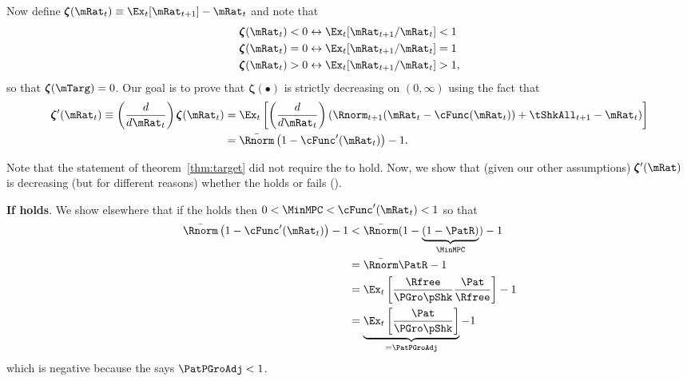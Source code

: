 \documentclass[BufferStockTheory]{subfiles}
\begin{document}
Now define \providecommand{\difFunc}{\pmb{\zeta}} $\difFunc(\mRat_t) \equiv 
\Ex_t[\mRat_{t+1}] - \mRat_t$ and note that
\begin{align}\label{eq:difRatioEquiv}
  \difFunc(\mRat_t) < 0 &\leftrightarrow \Ex_t[{\mRat}_{t+1}/\mRat_t] < 1 
                          \nonumber\\
  \difFunc(\mRat_t) = 0 &\leftrightarrow \Ex_t[{\mRat}_{t+1}/\mRat_t] = 1\\
  \difFunc(\mRat_t) > 0 &\leftrightarrow \Ex_t[{\mRat}_{t+1}/\mRat_t] > 
                          1,\nonumber
\end{align}
so that $\difFunc(\mTarg)=0$. Our goal is to prove that $\difFunc(\bullet)$ is strictly 
decreasing on $(0,\infty)$ using the fact that
\begin{align}
  \difFunc^{\prime}(\mRat_{t}) \equiv  \left( \frac{d}{d\mRat_{t}}\right) \difFunc(\mRat_t)  & = \Ex_{t}\left[
                                                                                               \left( \frac{d}{d\mRat_{t}}\right) \left( 
                                                                                               {\Rnorm}_{t+1}(\mRat_{t}-\cFunc(\mRat_{t}))+%
                                                                                               {\tShkAll}_{t+1} - {\mRat}_t\right) \right] \label{eq:difFuncDecreases} \\
                                                                                             & = \bar{\Rnorm}\left(1-\cFunc^{\prime}({\mRat}_t)\right) - 1.  \notag
\end{align}

Note that the statement of theorem~\ref{thm:target} did not require the {\RIC} to hold.  Now, we show that (given our other assumptions) $\difFunc^{\prime}(\mRat)$ is decreasing (but for different reasons) whether the {\RIC} holds or fails (\cncl{\RIC}).

\textbf{If {\RIC} holds}.   We show elsewhere  that if the {\RIC} holds then $0 < \MinMPC < \cFunc^{\prime}(\mRat_{t}) < 1$ so that 
\begin{align*}
  \bar{\Rnorm}\left(1-\cFunc^{\prime}({\mRat}_t)\right) - 1 & <  \bar{\Rnorm}(1-\underbrace{(1-\PatR)}_{\MinMPC}) - 1  \\
                                                            & = \bar{\Rnorm}\PatR - 1 \\
                                                            & = \Ex_{t}\left[\frac{\Rfree}{\PGro \pShk}\frac{\Pat}{\Rfree}\right] - 1 \\
                                                            & = \underbrace{\Ex_{t}\left[\frac{\Pat}{\PGro \pShk}\right]}_{= \PatPGroAdj} - 1 
\end{align*}
which is negative because the {\GIC} says $\PatPGroAdj < 1$.  
\end{document}
